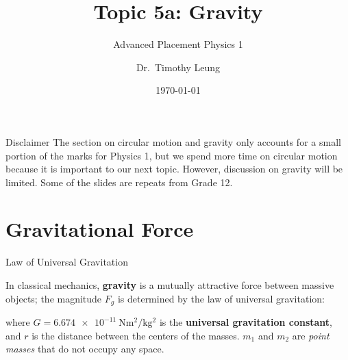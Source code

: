 \documentclass[12pt,compress,aspectratio=169]{beamer}
\title{Topic 5a: Gravity}
\subtitle{Advanced Placement Physics 1}
\author{Dr.\ Timothy Leung}
\institute{Olympiads School}
\date{\today}
\newcommand{\mb}[1]{\ensuremath\mathbf{#1}}
\newcommand{\eq}[2]{\vspace{#1}{\Large\begin{displaymath}#2\end{displaymath}}}
\begin{document}
\begin{frame}
  \maketitle
\end{frame}



\begin{frame}{Disclaimer}
  The section on circular motion and gravity only accounts for a small portion
  of the marks for Physics 1, but we spend more time on circular motion because
  it is important to our next topic. However, discussion on gravity will be
  limited. Some of the slides are repeats from Grade 12.
\end{frame}


\section{Gravitational Force}


\begin{frame}{Law of Universal Gravitation}
  \begin{center}
  \end{center}

  In classical mechanics, \textbf{gravity} is a mutually attractive force
  between massive objects; the magnitude $F_g$ is determined by the law of
  universal gravitation:

  \eq{-.2in}{
    \boxed{
      F_g=G\frac{m_1m_2}{r^2}
    }
  }

  where $G=\SI{6.674e-11}{\newton\metre\squared\per\kilo\gram\squared}$ is the
  \textbf{universal gravitation constant}, and $r$ is the distance between the
  centers of the masses. $m_1$ and $m_2$ are \emph{point masses} that do not
  occupy any space.
\end{frame}
\end{document}
